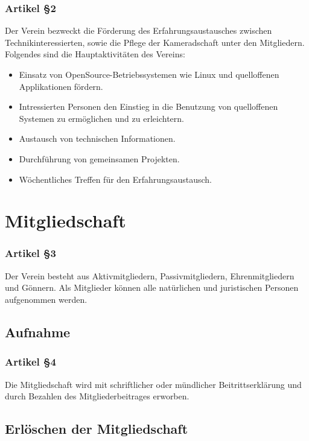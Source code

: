\documentclass[a4paper,10pt,fleqn]{article}
\begin{document}
\subsubsection*{Artikel §2}
Der Verein bezweckt die Förderung des Erfahrungsaustausches 
zwischen Technikinteressierten, sowie die Pflege der
Kameradschaft unter den Mitgliedern.\newline \newline
Folgendes sind die Hauptaktivitäten des Vereins:
\begin{itemize}
\item Einsatz von OpenSource-Betriebssystemen wie Linux und
 quelloffenen Applikationen fördern.
\item Intressierten Personen den Einstieg in die Benutzung 
von quelloffenen Systemen zu ermöglichen und zu erleichtern.
\item Austausch von technischen Informationen.
\item Durchführung von gemeinsamen Projekten.
\item Wöchentliches Treffen für den Erfahrungsaustausch.
\end{itemize}

\section{Mitgliedschaft}

\subsubsection*{Artikel §3}
Der Verein besteht aus Aktivmitgliedern, Passivmitgliedern, 
Ehrenmitgliedern und Gönnern. Als Mitglieder können alle
natürlichen und juristischen Personen aufgenommen werden.

\subsection{Aufnahme}

\subsubsection*{Artikel §4}
Die Mitgliedschaft wird mit schriftlicher oder mündlicher 
Beitrittserklärung und durch Bezahlen des
Mitgliederbeitrages erworben.

\subsection{Erlöschen der Mitgliedschaft}
\end{document}
